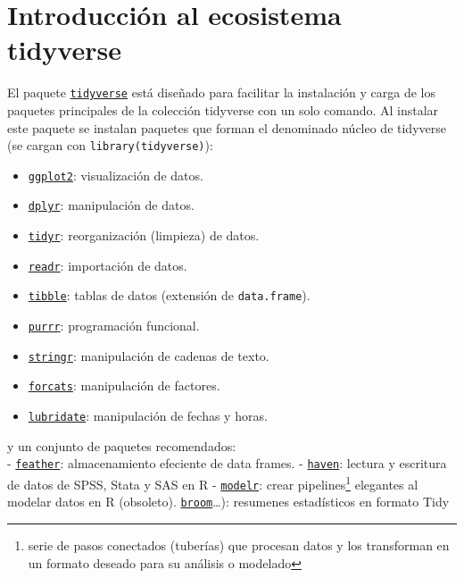 \documentclass[
]{book}
\providecommand{\tightlist}{%
  \setlength{\itemsep}{0pt}\setlength{\parskip}{0pt}}
\begin{document}
\section{Introducción al ecosistema tidyverse}\label{introTidyverse}

El paquete \href{https://tidyverse.tidyverse.org}{\texttt{tidyverse}} está diseñado para facilitar la instalación y carga de los paquetes principales de la colección tidyverse con un solo comando.
Al instalar este paquete se instalan paquetes que forman el denominado núcleo de tidyverse (se cargan con \texttt{library(tidyverse)}):

\begin{itemize}
\tightlist
\item
  \href{https://ggplot2.tidyverse.org}{\texttt{ggplot2}}: visualización de datos.
\item
  \href{https://dplyr.tidyverse.org}{\texttt{dplyr}}: manipulación de datos.
\item
  \href{https://tidyr.tidyverse.org}{\texttt{tidyr}}: reorganización (limpieza) de datos.
\item
  \href{https://readr.tidyverse.org}{\texttt{readr}}: importación de datos.
\item
  \href{https://tibble.tidyverse.org}{\texttt{tibble}}: tablas de datos (extensión de \texttt{data.frame}).
\item
  \href{https://purrr.tidyverse.org}{\texttt{purrr}}: programación funcional.
\item
  \href{https://github.com/tidyverse/stringr}{\texttt{stringr}}: manipulación de cadenas de texto.
\item
  \href{https://github.com/tidyverse/forcats}{\texttt{forcats}}: manipulación de factores.
\item
  \href{https://github.com/tidyverse/lubridate}{\texttt{lubridate}}: manipulación de fechas y horas.
\end{itemize}

y un conjunto de paquetes recomendados:\\
- \href{https://github.com/wesm/feather}{\texttt{feather}}: almacenamiento efeciente de data frames.
- \href{https://github.com/tidyverse/haven}{\texttt{haven}}: lectura y escritura de datos de SPSS, Stata y SAS en R
- \href{https://github.com/tidyverse/modelr}{\texttt{modelr}}: crear pipelines\footnote{serie de pasos conectados (tuberías) que procesan datos y los transforman en un formato deseado para su análisis o modelado} elegantes al modelar datos en R (obsoleto). \href{https://github.com/tidymodels/broom}{\texttt{broom}}\ldots): resumenes estadísticos en formato Tidy
\end{document}
